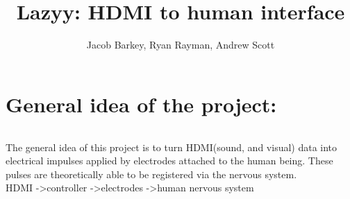 \documentclass{report}
\author{Jacob Barkey, Ryan Rayman, Andrew Scott}
\title{Lazyy: HDMI to human interface}
\begin{document}
\part{General idea of the project:}
\paragraph{}
\textrm{The general idea of this project is to turn HDMI(sound, and visual) data into electrical impulses applied by electrodes attached to the human being. These pulses are theoretically able to be registered via the nervous system.}
\\
\textrm{\large HDMI -\textgreater controller -\textgreater electrodes -\textgreater human nervous system}
\end{document}
